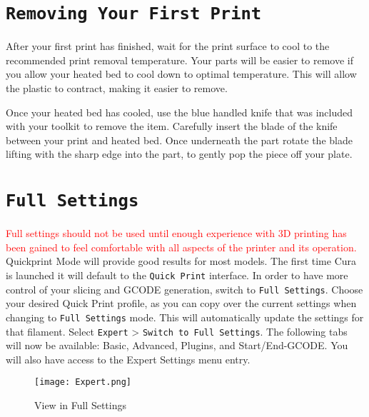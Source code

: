 \section{\texttt{Removing Your First Print}}
After your first print has finished, wait for the print surface to cool to the recommended print removal temperature.  Your parts will be easier to remove if you allow your heated bed to cool down to optimal temperature. This will allow the plastic to contract, making it easier to remove. 

Once your heated bed has cooled, use the blue handled knife that was included with your toolkit to remove the item. Carefully insert the blade of the knife between your print and heated bed. Once underneath the part rotate the blade lifting with the sharp edge into the part, to gently pop the piece off your plate.

\section{\texttt{Full Settings}}
\textcolor{red}{Full settings should not be used until enough experience with 3D printing has been gained to feel comfortable with all aspects of the printer and its operation.} Quickprint Mode will provide good results for most models.
The first time Cura is launched it will default to the \texttt{Quick Print} interface. In order to have more control of your slicing and GCODE generation, switch to \texttt{Full Settings}. Choose your desired Quick Print profile, as you can copy over the current settings when changing to \texttt{Full Settings} mode. This will automatically update the settings for that filament. Select \texttt{Expert} > \texttt{Switch to Full Settings}. The following tabs will now be available: Basic, Advanced, Plugins, and Start/End-GCODE. You will also have access to the Expert Settings menu entry. 
\begin{figure}[H]
\centering
\texttt{[image: Expert.png]}
\caption{View in Full Settings}
\label{fig:Full Settings View}
\end{figure}

